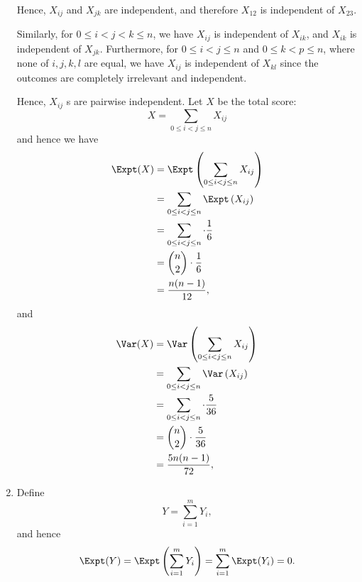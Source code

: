 \begin{enumerate}
          Hence, \(X_{ij}\) and \(X_{jk}\) are independent, and therefore \(X_{12}\) is independent of \(X_{23}\).

          Similarly, for \(0 \leq i < j < k \leq n\), we have \(X_{ij}\) is independent of \(X_{ik}\), and \(X_{ik}\) is independent of \(X_{jk}\). Furthermore, for \(0 \leq i < j \leq n\) and \(0 \leq k < p \leq n\), where none of \(i, j, k, l\) are equal, we have \(X_{ij}\) is independent of \(X_{kl}\) since the outcomes are completely irrelevant and independent.

          Hence, \(X_{ij}\) s are pairwise independent. Let \(X\) be the total score:
          \[
              X = \sum_{0 \leq i < j \leq n} X_{ij}
          \]
          and hence we have
          \begin{align*}
              \Expt(X) & = \Expt \left(\sum_{0 \leq i < j \leq n} X_{ij}\right) \\
                       & = \sum_{0 \leq i < j \leq n} \Expt\left(X_{ij}\right)  \\
                       & = \sum_{0 \leq i < j \leq n} \cdot \frac{1}{6}         \\
                       & = \binom{n}{2} \cdot \frac{1}{6}                       \\
                       & = \frac{n (n - 1)}{12},
          \end{align*}
          and
          \begin{align*}
              \Var(X) & = \Var \left(\sum_{0 \leq i < j \leq n} X_{ij}\right) \\
                      & = \sum_{0 \leq i < j \leq n} \Var\left(X_{ij}\right)  \\
                      & = \sum_{0 \leq i < j \leq n} \cdot \frac{5}{36}       \\
                      & = \binom{n}{2} \cdot \frac{5}{36}                     \\
                      & = \frac{5 n (n - 1)}{72},
          \end{align*}

    \item Define
          \[
              Y = \sum_{i = 1}^{m} Y_i,
          \]
          and hence
          \[
              \Expt(Y) = \Expt\left(\sum_{i = 1}^{m} Y_i\right) = \sum_{i = 1}^{m} \Expt(Y_i) = 0.
          \]


\end{enumerate}
